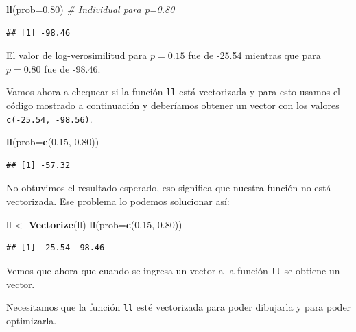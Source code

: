 \documentclass[10pt,]{krantz}
\makeatletter
\newenvironment{Shaded}{\begin{snugshade}}{\end{snugshade}}
\newcommand{\KeywordTok}[1]{\textcolor[rgb]{0.13,0.29,0.53}{\textbf{#1}}}
\newcommand{\DataTypeTok}[1]{\textcolor[rgb]{0.13,0.29,0.53}{#1}}
\newcommand{\FloatTok}[1]{\textcolor[rgb]{0.00,0.00,0.81}{#1}}
\newcommand{\StringTok}[1]{\textcolor[rgb]{0.31,0.60,0.02}{#1}}
\newcommand{\CommentTok}[1]{\textcolor[rgb]{0.56,0.35,0.01}{\textit{#1}}}
\newcommand{\NormalTok}[1]{#1}
\newenvironment{kframe}{%
\medskip{}
\setlength{\fboxsep}{.8em}
 \def\at@end@of@kframe{}%
 \ifinner\ifhmode%
  \def\at@end@of@kframe{\end{minipage}}%
  \begin{minipage}{\columnwidth}%
 \fi\fi%
 \def\FrameCommand##1{\hskip\@totalleftmargin \hskip-\fboxsep
 \colorbox{shadecolor}{##1}\hskip-\fboxsep
     \hskip-\linewidth \hskip-\@totalleftmargin \hskip\columnwidth}%
 \MakeFramed {\advance\hsize-\width
   \@totalleftmargin\z@ \linewidth\hsize
   \@setminipage}}%
 {\par\unskip\endMakeFramed%
 \at@end@of@kframe}
\renewenvironment{Shaded}{\begin{kframe}}{\end{kframe}}
\let\BeginKnitrBlock\begin \let\EndKnitrBlock\end
\makeatother
\begin{document}
\begin{Shaded}
\begin{Highlighting}[]
\KeywordTok{ll}\NormalTok{(}\DataTypeTok{prob=}\FloatTok{0.80}\NormalTok{)  }\CommentTok{# Individual para p=0.80}
\end{Highlighting}
\end{Shaded}

\begin{verbatim}
## [1] -98.46
\end{verbatim}

El valor de log-verosimilitud para \(p=0.15\) fue de -25.54 mientras que
para \(p=0.80\) fue de -98.46.

Vamos ahora a chequear si la función \texttt{ll} está vectorizada y para
esto usamos el código mostrado a continuación y deberíamos obtener un
vector con los valores \texttt{c(-25.54,\ -98.56)}.

\begin{Shaded}
\begin{Highlighting}[]
\KeywordTok{ll}\NormalTok{(}\DataTypeTok{prob=}\KeywordTok{c}\NormalTok{(}\FloatTok{0.15}\NormalTok{, }\FloatTok{0.80}\NormalTok{))}
\end{Highlighting}
\end{Shaded}

\begin{verbatim}
## [1] -57.32
\end{verbatim}

No obtuvimos el resultado esperado, eso significa que nuestra función no
está vectorizada. Ese problema lo podemos solucionar así:

\begin{Shaded}
\begin{Highlighting}[]
\NormalTok{ll <-}\StringTok{ }\KeywordTok{Vectorize}\NormalTok{(ll)}
\KeywordTok{ll}\NormalTok{(}\DataTypeTok{prob=}\KeywordTok{c}\NormalTok{(}\FloatTok{0.15}\NormalTok{, }\FloatTok{0.80}\NormalTok{))}
\end{Highlighting}
\end{Shaded}

\begin{verbatim}
## [1] -25.54 -98.46
\end{verbatim}

Vemos que ahora que cuando se ingresa un vector a la función \texttt{ll}
se obtiene un vector.

\BeginKnitrBlock{rmdnote}
Necesitamos que la función \texttt{ll} esté vectorizada para poder
dibujarla y para poder optimizarla.
\EndKnitrBlock{rmdnote}
\end{document}
